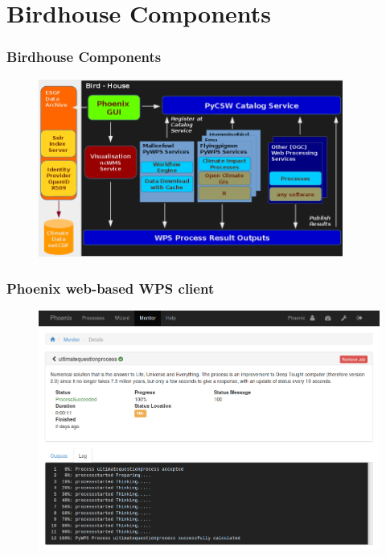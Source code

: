 \documentclass{beamer}
\begin{document}
  \section{Birdhouse Components}


  \begin{frame}[plain]
    \frametitle{Birdhouse Components}
    \begin{figure}
      \begin{center}
        \includegraphics[width=10cm]{images/birdhouse.png}
      \end{center}
    \end{figure}
  \end{frame}


  \begin{frame}[plain]
    \frametitle{Phoenix web-based WPS client}
    \begin{figure}
      \includegraphics[width=11.5cm]{images/phoenix.png}
    \end{figure}
  \end{frame}
\end{document}

